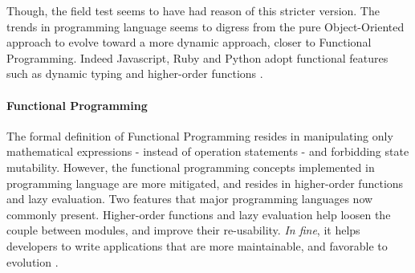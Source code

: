 Though, the field test seems to have had reason of this stricter version.
The trends in programming language seems to digress from the pure Object-Oriented approach to evolve toward a more dynamic approach, closer to Functional Programming.
Indeed Javascript, Ruby and Python adopt functional features such as dynamic typing and higher-order functions \cite{Ecma1999}.








\paragraph{Functional Programming} \label{chapter3:software-design:programming-models:functional-programming}


The formal definition of Functional Programming resides in manipulating only mathematical expressions - instead of operation statements - and forbidding state mutability.
However, the functional programming concepts implemented in programming language are more mitigated, and resides in higher-order functions and lazy evaluation.
Two features that major programming languages now commonly present.
Higher-order functions and lazy evaluation help loosen the couple between modules, and improve their re-usability.
\textit{In fine}, it helps developers to write applications that are more maintainable, and favorable to evolution \cite{Hughes1989}.

